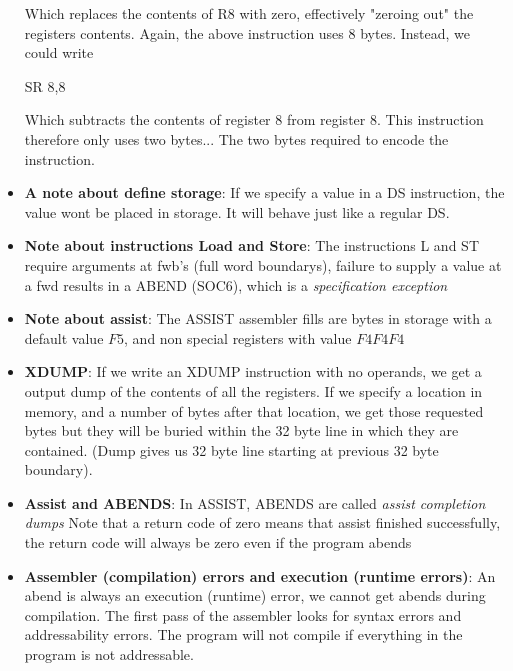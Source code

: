 \documentclass{report}
\begin{document}
\begin{itemize}
\begin{cppcode}
                    \end{cppcode}
                    \bigbreak \noindent 
                    Which replaces the contents of R8 with zero, effectively "zeroing out" the registers contents. Again, the above instruction uses 8 bytes. Instead, we could write
                    \bigbreak \noindent 
                    \begin{cppcode}
                    SR 8,8
                    \end{cppcode}
                    \bigbreak \noindent 
                    Which subtracts the contents of register 8 from register 8. This instruction therefore only uses two bytes... The two bytes required to encode the instruction.
                \item \textbf{A note about define storage}: If we specify a value in a DS instruction, the value wont be placed in storage. It will behave just like a regular DS.
                \item \textbf{Note about instructions Load and Store}: The instructions L and ST require arguments at fwb's (full word boundarys), failure to supply a value at a fwd results in a ABEND (SOC6), which is a \textit{specification exception}
                \item \textbf{Note about assist}: The ASSIST assembler fills are bytes in storage with a default value $F5$, and non special registers with value $F4F4F4$
                \item \textbf{XDUMP}: If we write an XDUMP instruction with no operands, we get a output dump of the contents of all the registers. If we specify a location in memory, and a number of bytes after that location, we get those requested bytes but they will be buried within the 32 byte line in which they are contained. (Dump gives us 32 byte line starting at previous 32 byte boundary).
                \item \textbf{Assist and ABENDS}: In ASSIST, ABENDS are called \textit{assist completion dumps}
                    \bigbreak \noindent 
                    Note that a return code of zero means that assist finished successfully, the return code will always be zero even if the program abends
                \item \textbf{Assembler (compilation) errors and execution (runtime errors)}: An abend is always an execution (runtime) error, we cannot get abends during compilation.
                    \bigbreak \noindent 
                    The first pass of the assembler looks for syntax errors and addressability errors. The program will not compile if everything in the program is not addressable.

\end{itemize}
\end{document}
